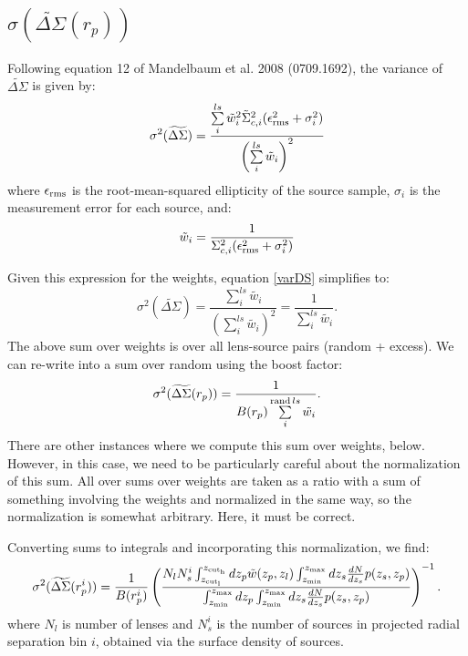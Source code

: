 \documentclass[onecolumn,amsmath,aps,fleqn, superscriptaddress]{revtex4}
\begin{document}
\subsection{$\sigma(\widetilde{\Delta \Sigma}(r_p))$}
Following equation 12 of Mandelbaum et al. 2008 (0709.1692), the variance of $\widetilde{\Delta\Sigma}$ is given by:
\begin{equation}
\sigma^2(\widetilde{\Delta\Sigma}) = \frac{\sum\limits_i^{ls} \tilde{w}_i^2 \tilde{\Sigma}_{c,i}^2 (\epsilon_{\rm rms}^2 + \sigma_i^2)}{\left(\sum\limits_i^{ls} \tilde{w}_i\right)^2}
\label{varDS}
\end{equation}
where $\epsilon_{\rm rms}$ is the root-mean-squared ellipticity of the source sample, $\sigma_i$ is the measurement error for each source, and:
\begin{equation}
\tilde{w}_i = \frac{1}{\Sigma_{c,i}^2(\epsilon_{\rm rms}^2 + \sigma_i^2)}
\label{weights}
\end{equation}

Given this expression for the weights, equation \ref{varDS} simplifies to:
\begin{equation}
\sigma^2(\widetilde{\Delta\Sigma}) = \frac{\sum\limits_i^{ls} \tilde{w_i}}{\left(\sum\limits_i^{ls} \tilde{w_i}\right)^2} = \frac{1}{\sum\limits_i^{ls} \tilde{w_i}}.
\label{varDS_2}
\end{equation}
The above sum over weights is over all lens-source pairs (random + excess). We can re-write into a sum over random using the boost factor:
\begin{equation}
\sigma^2(\widetilde{\Delta\Sigma}(r_p)) = \frac{1}{B(r_p)\sum\limits_i^{{\rm rand} \, ls} \tilde{w_i}}.
\label{varDS_2}
\end{equation}
There are other instances where we compute this sum over weights, below. However, in this case, we need to be particularly careful about the normalization of this sum. All over sums over weights are taken as a ratio with a sum of something involving the weights and normalized in the same way, so the normalization is somewhat arbitrary. Here, it must be correct.

Converting sums to integrals and incorporating this normalization, we find:
\begin{equation}
\sigma^2(\widetilde{\Delta\Sigma}(r_p^i)) = \frac{1}{B(r_p^i)} \left(\frac{N_l N_s^i\int_{z_{\rm cut_l}}^{z_{\rm cut_h}} dz_p \tilde{w}(z_p, z_l) \int_{z_{\rm min}}^{z_{\rm max}} dz_s \frac{dN}{dz_s}p(z_s, z_p)}{ \int_{z_{\rm min}}^{z_{\rm max}} dz_p \int_{z_{\rm min}}^{z_{\rm max}} dz_s \frac{dN}{dz_s}p(z_s, z_p)}\right)^{-1}.
\label{sum_varDS}
\end{equation}
where $N_l$ is number of lenses and $N_s^i$ is the number of sources in projected radial separation bin $i$, obtained via the surface density of sources. 
\end{document}

